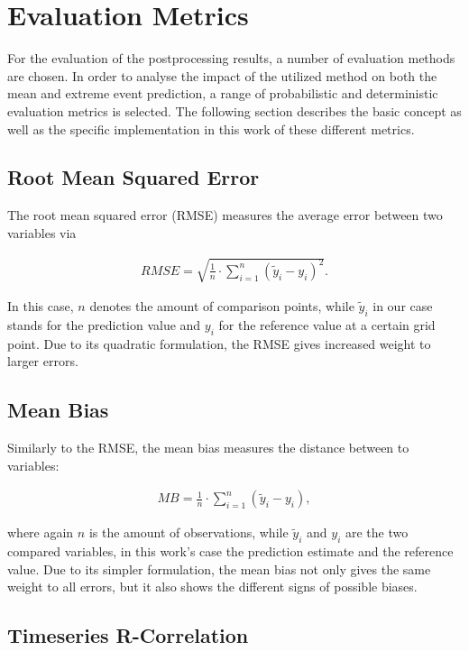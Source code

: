 \documentclass[ba-lentz.tex]{subfile}
\begin{document}
\section{Evaluation Metrics}

For the evaluation of the postprocessing results, a number of evaluation methods are chosen.
In order to analyse the impact of the utilized method on both the mean and extreme event prediction, a range of probabilistic and deterministic evaluation metrics is selected.
The following section describes the basic concept as well as the specific implementation in this work of these different metrics.

\subsection{Root Mean Squared Error}

The root mean squared error (RMSE) measures the average error between two variables via

\begin{align}
    RMSE  = \sqrt{\frac{1}{n} \cdot \sum_{i=1}^{n} (\tilde{y}_i - y_i)^2} .\label{rmse}
\end{align}

In this case, $n$ denotes the amount of comparison points, while $\tilde{y}_i$ in our case stands for the prediction value and $y_i$ for the reference value at a certain grid point.
Due to its quadratic formulation, the RMSE gives increased weight to larger errors.

\subsection{Mean Bias}

Similarly to the RMSE, the mean bias measures the distance between to variables:

\begin{align}
    MB = \frac{1}{n} \cdot \sum_{i=1}^{n} (\tilde{y}_i - y_i) , \label{mae}
\end{align}

where again $n$ is the amount of observations, while $\tilde{y}_i$ and $y_i$ are the two compared variables, in this work's case the prediction estimate and the reference value.
Due to its simpler formulation, the mean bias not only gives the same weight to all errors, but it also shows the different signs of possible biases.

\subsection{Timeseries R-Correlation}
\end{document}
